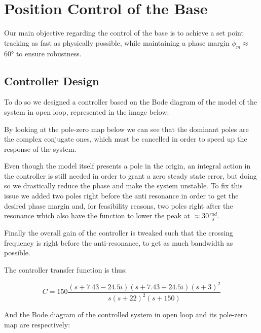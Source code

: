 \chapter{Position Control of the Base}
\label{cha:position_base}

Our main objective regarding the control of the base is to achieve a set point tracking as fast as physically possible, while maintaining a phase margin $\phi_m\approx$ 60° to ensure robustness.

\section{Controller Design}

To do so we designed a controller based on the Bode diagram of the model of the system in open loop, represented in the image below:


By looking at the pole-zero map below we can see that the dominant poles are the complex conjugate ones, which must be cancelled in order to speed up the response of the system.


Even though the model itself presents a pole in the origin, an integral action in the controller is still needed in order to grant a zero steady state error, but doing so we drastically reduce the phase and make the system unstable.
To fix this issue we added two poles right before the anti resonance in order to get the desired phase margin and, for feasibility reasons, two poles right after the resonance which also have the function to lower the peak at $\approx 30 \frac{rad}{s}$.

Finally the overall gain of the controller is tweaked such that the crossing frequency is right before the anti-resonance, to get as much bandwidth as possible.

The controller transfer function is thus:

\begin{equation}
    C = 150 \frac{(s+7.43-24.5i)(s+7.43+24.5i)(s+3)^2}{s(s+22)^2(s+150)}
\end{equation}

And the Bode diagram of the controlled system in open loop and its pole-zero map are respectively:



